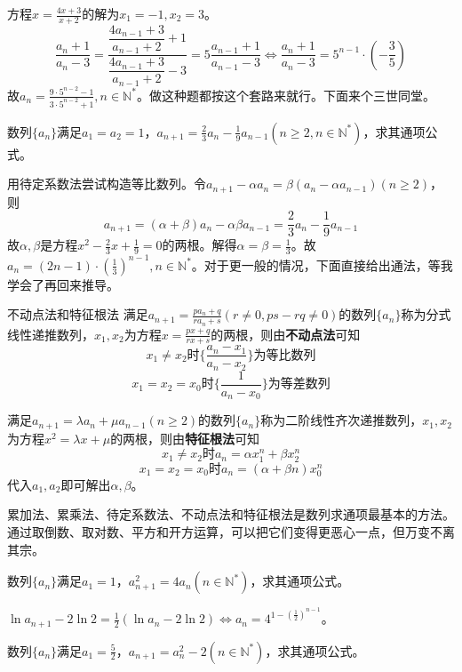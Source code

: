 \documentclass[../sample]{subfiles}
\begin{document}
方程$x=\frac{4x+3}{x+2}$的解为$x_1=-1, x_2=3$。
\[\frac{a_n+1}{a_n-3}=\frac{\dfrac{4a_{n-1}+3}{a_{n-1}+2}+1}{\dfrac{4a_{n-1}+3}{a_{n-1}+2}-3}=5\frac{a_{n-1}+1}{a_{n-1}-3}\Leftrightarrow \frac{a_n+1}{a_n-3}=5^{n-1}·(-\frac{3}{5})\]
故$a_n=\frac{9·5^{n-2}-1}{3·5^{n-2}+1},n\in\mathbb{N^*}$。做这种题都按这个套路来就行。下面来个三世同堂。

\begin{problem}
  数列$\{a_n\}$满足$a_1=a_2=1$，$a_{n+1}=\frac{2}{3}a_n-\frac{1}{9}a_{n-1}(n\geq 2,n\in\mathbb{N^*})$，求其通项公式。
\end{problem}

用待定系数法尝试构造等比数列。令$a_{n+1}-\alpha a_n=\beta (a_n-\alpha a_{n-1})(n\geq 2)$，则\[a_{n+1}=(\alpha+\beta)a_n-\alpha\beta a_{n-1}=\frac{2}{3}a_n-\frac{1}{9}a_{n-1}\]
故$\alpha, \beta$是方程$x^2-\frac{2}{3}x+\frac{1}{9}=0$的两根。解得$\alpha=\beta=\frac{1}{3}$。故$a_n=(2n-1)·(\frac{1}{3})^{n-1},n\in\mathbb{N^*}$。对于更一般的情况，下面直接给出通法，等我学会了再回来推导。

\begin{theorem}{不动点法和特征根法}
  满足$a_{n+1}=\frac{pa_n+q}{ra_n+s}(r\neq 0, ps-rq\neq 0)$的数列$\{a_n\}$称为分式线性递推数列，$x_1, x_2$为方程$x=\frac{px+q}{rx+s}$的两根，则由\textbf{不动点法}可知
  \[x_1\neq x_2时\{\frac{a_n-x_1}{a_n-x_2}\}为等比数列\]
  \[x_1=x_2=x_0时\{\frac{1}{a_n-x_0}\}为等差数列\]

  满足$a_{n+1}=\lambda a_n+\mu a_{n-1}(n\geq 2)$的数列$\{a_n\}$称为二阶线性齐次递推数列，$x_1, x_2$为方程$x^2=\lambda x+\mu$的两根，则由\textbf{特征根法}可知
  \[x_1\neq x_2时a_n=\alpha x_1^{n}+\beta x_2^{n}\]
  \[x_1=x_2=x_0时a_n=(\alpha+\beta n)x_0^{n}\]
  代入$a_1, a_2$即可解出$\alpha, \beta$。
\end{theorem}

累加法、累乘法、待定系数法、不动点法和特征根法是数列求通项最基本的方法。通过取倒数、取对数、平方和开方运算，可以把它们变得更恶心一点，但万变不离其宗。

\begin{problem}
  数列$\{a_n\}$满足$a_1=1$，$a_{n+1}^2=4a_n(n\in\mathbb{N^*})$，求其通项公式。
\end{problem}

$\ln a_{n+1}-2\ln 2=\frac{1}{2}(\ln a_n-2\ln 2)\Leftrightarrow a_n=4^{1-(\frac{1}{2})^{n-1}}$。

\begin{problem}
  数列$\{a_n\}$满足$a_1=\frac{5}{2}$，$a_{n+1}=a_n^2-2(n\in\mathbb{N^*})$，求其通项公式。
\end{problem}
\end{document}
